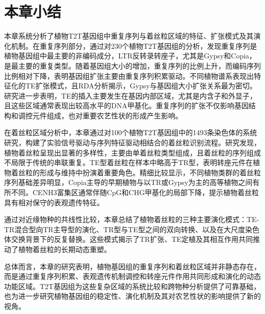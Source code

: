 

\section{本章小结}

本章系统分析了植物T2T基因组中重复序列与着丝粒区域的特征、扩张模式及其演化机制。在重复序列部分，通过对230个植物T2T基因组的分析，发现重复序列是植物基因组中最主要的非编码成分，LTR反转录转座子，尤其是Gypsy和Copia，是最主要的重复类型。随着基因组大小的增加，重复序列的比例上升，而编码序列比例相对下降，表明基因组扩张主要由重复序列积累驱动。不同植物谱系表现出特征化的TE扩张模式，且RDA分析揭示，Gypsy与基因组大小扩张关系最为密切。研究进一步表明，TE的插入主要发生在基因内部区域，尤其是内含子和外显子，且这些区域通常表现出较高水平的DNA甲基化。重复序列的扩张不仅影响基因结构和调控元件组成，也对重要农艺性状的形成产生影响。

在着丝粒区域分析中，本章通过对100个植物T2T基因组中的1493条染色体的系统研究，构建了实验信号驱动与序列特征驱动相结合的着丝粒识别流程。研究发现，植物着丝粒呈现出显著的多样性，主要由单着丝粒类型组成，且着丝粒的序列组成不局限于传统的串联重复。TE型着丝粒在样本中略高于TR型，表明转座元件在植物着丝粒的形成与维持中扮演着重要角色。精细比较显示，不同植物类群的着丝粒序列基础差异明显，Copia主导的早期植物与以TR或Gypsy为主的高等植物之间有所不同。CENH3富集区通常伴随CpG和CHG甲基化的局部下降，提示植物着丝粒具有相对保守的表观遗传特征。

通过对近缘物种的共线性比较，本章总结了植物着丝粒的三种主要演化模式：TE-TR混合型向TR主导型的演化、TR型与TE型之间的双向转换、以及在大尺度染色体交换背景下的反复替换。这些模式揭示了TR扩张、TE定植及其相互作用共同推动了植物着丝粒的长期动态重塑。

总体而言，本章的研究表明，植物基因组的重复序列和着丝粒区域并非静态存在，而是通过重复序列积累、表观遗传机制调控和转座元件作用共同形成和演化的动态功能区域。T2T基因组为这些复杂区域的系统比较和跨物种分析提供了可靠基础，也为进一步研究植物基因组的稳定性、演化机制及其对农艺性状的影响提供了新的视角。

